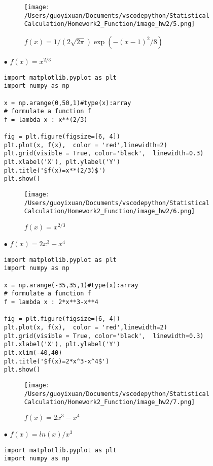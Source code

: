\begin{itemize}
\begin{figure}[H]
    \centering
        \texttt{[image: /Users/guoyixuan/Documents/vscodepython/Statistical Calculation/Homework2\_Function/image\_hw2/5.png]}
    \caption{$f(x)=1/(2\sqrt{2 \pi}) \exp(-(x-1)^2/8)$}
    \label{fig:1/sqrt}
\end{figure}

\item[$\bullet$] $f(x)=x^{2/3}$
\bigskip
\begin{lstlisting}
import matplotlib.pyplot as plt
import numpy as np
 
x = np.arange(0,50,1)#type(x):array
# formulate a function f
f = lambda x : x**(2/3)
 
fig = plt.figure(figsize=[6, 4])
plt.plot(x, f(x),  color = 'red',linewidth=2)
plt.grid(visible = True, color='black',  linewidth=0.3)
plt.xlabel('X'), plt.ylabel('Y')
plt.title('$f(x)=x**(2/3)$')
plt.show()
\end{lstlisting}

\begin{figure}[H]
    \centering
        \texttt{[image: /Users/guoyixuan/Documents/vscodepython/Statistical Calculation/Homework2\_Function/image\_hw2/6.png]}
    \caption{$f(x)=x^{2/3}$}
    \label{fig:x^(2/3)}
\end{figure}

\item[$\bullet$]$f(x)=2x^3-x^4$
\bigskip
\begin{lstlisting}
import matplotlib.pyplot as plt
import numpy as np
 
x = np.arange(-35,35,1)#type(x):array
# formulate a function f
f = lambda x : 2*x**3-x**4
 
fig = plt.figure(figsize=[6, 4])
plt.plot(x, f(x),  color = 'red',linewidth=2)
plt.grid(visible = True, color='black',  linewidth=0.3)
plt.xlabel('X'), plt.ylabel('Y')
plt.xlim(-40,40)
plt.title('$f(x)=2*x^3-x^4$')
plt.show()
\end{lstlisting}

\begin{figure}[H]
    \centering
        \texttt{[image: /Users/guoyixuan/Documents/vscodepython/Statistical Calculation/Homework2\_Function/image\_hw2/7.png]}
    \caption{$f(x)=2x^3-x^4$}
    \label{fig:f(x)=2x^3-x^4}
\end{figure}

\item[$\bullet$]$f(x)=ln(x)/x^3$
\bigskip
\begin{lstlisting}
import matplotlib.pyplot as plt
import numpy as np
 

\end{lstlisting}
\end{itemize}
